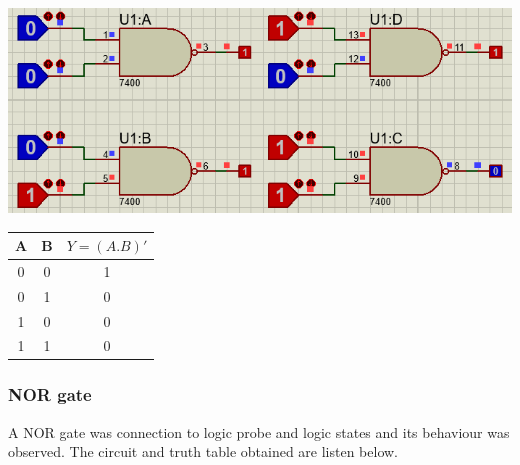\documentclass[a4paper, 12pt]{article}
\begin{document}
\begin{minipage}[c]{.7\textwidth}
  \centering
  \includegraphics[scale=0.5]{nand}
\end{minipage}
\begin{minipage}{.3\textwidth}
  \begin{center}
    \begin{tabular}{ |c|c|c| }
      \hline
      A & B & $Y=(A.B)'$ \\
      \hline
      0 & 0 & 1 \\
      \hline
      0 & 1 & 0 \\
      \hline
      1 & 0 & 0 \\
      \hline
      1 & 1 & 0 \\
      \hline
    \end{tabular}
  \end{center}
\end{minipage}


\subsubsection{NOR gate}
A NOR gate was connection to logic probe and logic states and its behaviour was observed.
The circuit and truth table obtained are listen below. \\
\end{document}
